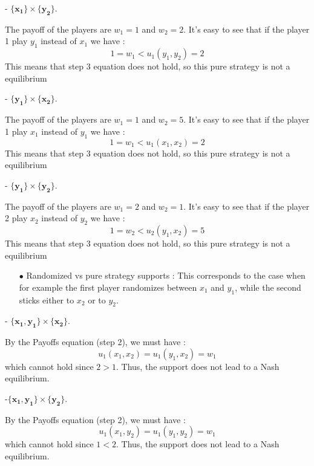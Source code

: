 - $\mathbf{\{x_1\}}\times\mathbf{\{y_2\}}$.

The payoff of the players are $w_1=1$ and $w_2=2$. It's easy to see that if the player 1 play $y_1$ instead of $x_1$ we have :
\begin{equation*}
    1=w_1<u_1(y_1,y_2)=2
\end{equation*}
This means that step 3  equation does not hold, so this pure strategy is not a equilibrium 

- $\mathbf{\{y_1\}}\times\mathbf{\{x_2\}}$.

The payoff of the players are $w_1=1$ and $w_2=5$. It's easy to see that if the player 1 play $x_1$ instead of $y_1$ we have :
\begin{equation*}
    1=w_1<u_1(x_1,x_2)=2
\end{equation*}
This means that step 3  equation does not hold, so this pure strategy is not a equilibrium 

- $\mathbf{\{y_1\}}\times\mathbf{\{y_2\}}$.

The payoff of the players are $w_1=2$ and $w_2=1$. It's easy to see that if the player 2 play $x_2$ instead of $y_2$ we have :
\begin{equation*}
    1=w_2<u_2(y_1,x_2)=5
\end{equation*}
This means that step 3  equation does not hold, so this pure strategy is not a equilibrium 


\begin{itemize}
  \item[$\bullet$] Randomized vs pure strategy supports : This corresponds to the case when for example the first player randomizes between $x_1$ and $y_1$, while the second sticks either to $x_2$ or to $y_2$.
\end{itemize}

- $\mathbf{\{x_1,y_1\}}\times\mathbf{\{x_2\}}$.

By the Payoffs equation (step 2), we must have :
\begin{equation*}
    u_1(x_1,x_2)=u_1(y_1,x_2)=w_1
\end{equation*}
which cannot hold since $2>1$. Thus, the support does not lead to a Nash equilibrium.


-$\mathbf{\{x_1,y_1\}}\times\mathbf{\{y_2\}}$.

By the Payoffs equation (step 2), we must have :
 \begin{equation*}
    u_1(x_1,y_2)=u_1(y_1,y_2)=w_1
\end{equation*}
which cannot hold since $1<2$. Thus, the support does not lead to a Nash equilibrium.


